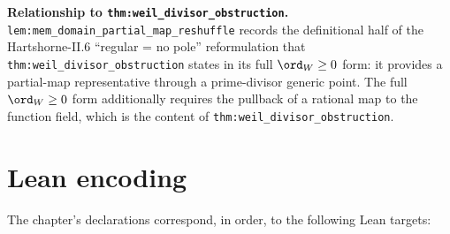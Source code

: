 \begin{remark}
  \label{rmk:mem_domain_partial_map_reshuffle_scope}
  \textbf{Relationship to \texttt{thm:weil_divisor_obstruction}.}
  \texttt{lem:mem_domain_partial_map_reshuffle} records the definitional half of
  the Hartshorne-II.6 ``regular = no pole'' reformulation that
  \texttt{thm:weil_divisor_obstruction} states in its full \(\ord_W \geq 0\)
  form: it provides a partial-map representative through a prime-divisor generic
  point. The full \(\ord_W \geq 0\) form additionally requires the pullback of a
  rational map to the function field, which is the content of
  \texttt{thm:weil_divisor_obstruction}.
\end{remark}

\section{Lean encoding}
\label{sec:codim1_lean_encoding}

The chapter's declarations correspond, in order, to the following Lean targets:

